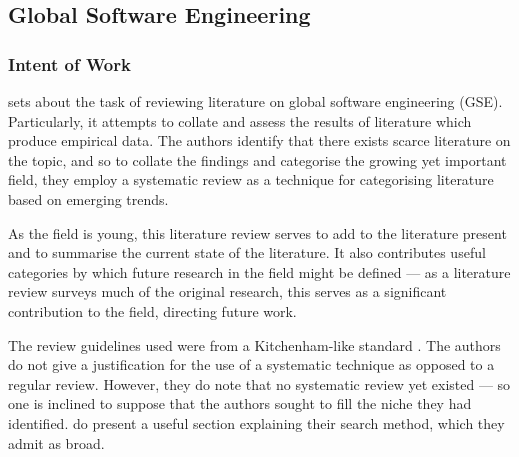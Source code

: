 \subsection{Global Software Engineering}
\subsubsection{Intent of Work}
\citet*{Smite2010} sets about the task of reviewing literature on global software engineering (GSE). Particularly, it attempts to collate and assess the results of literature which produce empirical data. The authors identify that there exists scarce literature on the topic, and so to collate the findings and categorise the growing yet important field, they employ a systematic review as a technique for categorising literature based on emerging trends.\par

As the field is young, this literature review serves to add to the literature present and to summarise the current state of the literature. It also contributes useful categories by which future research in the field might be defined --- as a literature review surveys much of the original research, this serves as a significant contribution to the field, directing future work.\par

The review guidelines used were from a Kitchenham-like standard \citep{Kitchenham2007}. The authors do not give a justification for the use of a systematic technique as opposed to a regular review. However, they do note that no systematic review yet existed --- so one is inclined to suppose that the authors sought to fill the niche they had identified. \citeauthor{Smite2010} do present a useful section explaining their search method, which they admit as broad.\par

